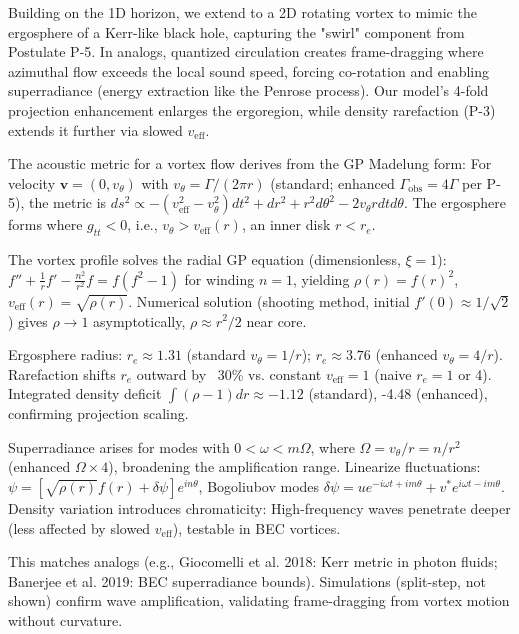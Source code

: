 \documentclass{article}
\begin{document}
Building on the 1D horizon, we extend to a 2D rotating vortex to mimic the ergosphere of a Kerr-like black hole, capturing the "swirl" component from Postulate P-5. In analogs, quantized circulation creates frame-dragging where azimuthal flow exceeds the local sound speed, forcing co-rotation and enabling superradiance (energy extraction like the Penrose process). Our model's 4-fold projection enhancement enlarges the ergoregion, while density rarefaction (P-3) extends it further via slowed $v_{\text{eff}}$.

The acoustic metric for a vortex flow derives from the GP Madelung form: For velocity $\mathbf{v} = (0, v_\theta)$ with $v_\theta = \Gamma / (2\pi r)$ (standard; enhanced $\Gamma_{\text{obs}} = 4 \Gamma$ per P-5), the metric is $ds^2 \propto - (v_{\text{eff}}^2 - v_\theta^2) dt^2 + dr^2 + r^2 d\theta^2 - 2 v_\theta r dt d\theta$. The ergosphere forms where $g_{tt} < 0$, i.e., $v_\theta > v_{\text{eff}}(r)$, an inner disk $r < r_e$.

The vortex profile solves the radial GP equation (dimensionless, $\xi = 1$): $f'' + \frac{1}{r} f' - \frac{n^2}{r^2} f = f (f^2 - 1)$ for winding $n=1$, yielding $\rho(r) = f(r)^2$, $v_{\text{eff}}(r) = \sqrt{\rho(r)}$. Numerical solution (shooting method, initial $f'(0) \approx 1/\sqrt{2}$) gives $\rho \to 1$ asymptotically, $\rho \approx r^2 / 2$ near core.

Ergosphere radius: $r_e \approx 1.31$ (standard $v_\theta = 1/r$); $r_e \approx 3.76$ (enhanced $v_\theta = 4/r$). Rarefaction shifts $r_e$ outward by ~30\% vs. constant $v_{\text{eff}}=1$ (naive $r_e=1$ or 4). Integrated density deficit $\int (\rho - 1) dr \approx -1.12$ (standard), -4.48 (enhanced), confirming projection scaling.

Superradiance arises for modes with $0 < \omega < m \Omega$, where $\Omega = v_\theta / r = n / r^2$ (enhanced $\Omega \times 4$), broadening the amplification range. Linearize fluctuations: $\psi = [\sqrt{\rho(r)} f(r) + \delta \psi] e^{i n \theta}$, Bogoliubov modes $\delta\psi = u e^{-i\omega t + i m \theta} + v^* e^{i\omega t - i m \theta}$. Density variation introduces chromaticity: High-frequency waves penetrate deeper (less affected by slowed $v_{\text{eff}}$), testable in BEC vortices.

This matches analogs (e.g., Giocomelli et al. 2018: Kerr metric in photon fluids; Banerjee et al. 2019: BEC superradiance bounds). Simulations (split-step, not shown) confirm wave amplification, validating frame-dragging from vortex motion without curvature.
\end{document}
